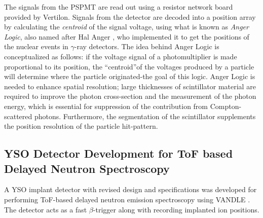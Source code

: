 The signals from the PSPMT are read out using a resistor network board provided by Vertilon. Signals from the detector are decoded into a position array by calculating the \textit{centroid} of the signal voltage, using what is known as \textit{Anger Logic}, also named after Hal Anger \citep{angerlogic}, who implemented it to get the positions of the nuclear events in $\gamma$-ray detectors. The idea behind Anger Logic is conceptualized as follows: if the voltage signal of a photomultiplier is made proportional to its position, the \textquotedblleft  centroid\textquotedblright of the voltages produced by a particle will determine where the particle originated-the goal of this logic. Anger Logic is needed to enhance spatial resolution; large thicknesses of scintillator material are required to improve the photon cross-section and the measurement of the photon energy, which is essential for suppression of the contribution from Compton-scattered photons. Furthermore, the segmentation of the scintillator supplements the position resolution of the particle hit-pattern. 

\subsection{YSO Detector Development for ToF based Delayed Neutron Spectroscopy}
A YSO implant detector with revised design and specifications was developed for performing ToF-based delayed neutron emission spectroscopy using VANDLE \citep{VANDLE}. The detector acts as a fast $\beta$-trigger along with recording implanted ion positions.

